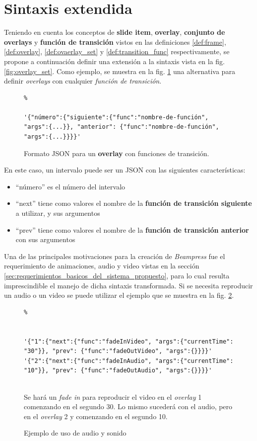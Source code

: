 	\section{Sintaxis extendida} %
	\label{sec:sintaxis_extendida}
	

	Teniendo en cuenta los conceptos de \textbf{slide item}, \textbf{overlay}, \textbf{conjunto de overlays} y \textbf{función de transición} vistos en las definiciones \ref{def:frame}, \ref{def:overlay}, \ref{def:ovaerlay_set} y \ref{def:transition_func} respectivamente, se propone a continuación definir una extensión a la sintaxis vista en la fig.\ref{fig:overlay_set}. Como ejemplo, se muestra en la fig. \ref{fig:json_format} una alternativa para definir \textit{overlays} con cualquier \textit{función de transición}.

		\begin{figure}[htb]%
			\begin{lstlisting}%

'{"número":{"siguiente":{"func":"nombre-de-función", "args":{...}}, "anterior": {"func":"nombre-de-función", "args":{...}}}}'	
			\end{lstlisting}
		\caption{
			Formato JSON para un \textbf{overlay} con funciones de transición. 
			\label{fig:json_format} }
		\end{figure}


	En este caso, un intervalo puede ser un JSON con las siguientes características:
	\begin{itemize}
		\item ``número'' es el número del intervalo
		\item ``next'' tiene como valores el nombre de la \textbf{función de transición siguiente} a utilizar, y sus argumentos
		\item ``prev'' tiene como valores el nombre de la \textbf{función de transición anterior} con sus argumentos
	\end{itemize}

	Una de las principales motivaciones para la creación de \textit{Beampress} fue el requerimiento de animaciones, audio y video vistas en la sección \ref{sec:requerimientos_basicos_del_sistema_propuesto}, para lo cual resulta imprescindible el manejo de dicha sintaxis transformada. Si se necesita reproducir un audio o un video se puede utilizar el ejemplo que se muestra en la fig. \ref{fig:ex_audio_video_syntax}.
	\begin{figure}[htb]%
		\begin{lstlisting}%


'{"1":{"next":{"func":"fadeInVideo", "args":{"currentTime": "30"}}, "prev": {"func":"fadeOutVideo", "args":{}}}}'
'{"2":{"next":{"func":"fadeInAudio", "args":{"currentTime": "10"}}, "prev": {"func":"fadeOutAudio", "args":{}}}}'  
				
		\end{lstlisting}
		\caption{Ejemplo de uso de audio y sonido} 
			\label{fig:ex_audio_video_syntax}
		\small Se hará un \textit{fade in} para reproducir el video en el \textit{overlay} 1 comenzando en el segundo 30. Lo mismo sucederá con el audio, pero en el \textit{overlay} 2 y comenzando en el segundo 10.
		\end{figure}

